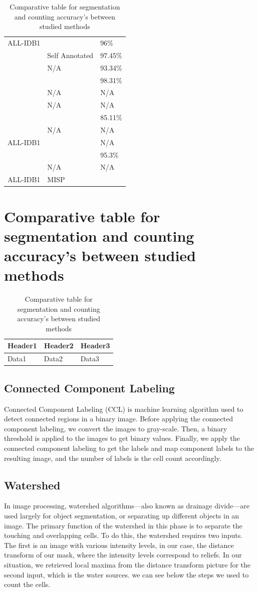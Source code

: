\documentclass[conference]{IEEEtran}
\begin{document}
\begin{table}[htbp]
\centering
\caption{Comparative table for segmentation and counting accuracy's between studied methods}
\label{tab:label}
\begin{tabular}{lll}
\hline
ALL-IDB1 & & 96\% \\
 & Self Annotated & 97.45\% \\
 & N/A & 93.34\% \\
 & & 98.31\% \\
 & N/A & N/A \\
 & N/A & N/A \\
 & & 85.11\% \\
 & N/A & N/A \\
ALL-IDB1 & & N/A \\
 & & 95.3\% \\
 & N/A & N/A \\
ALL-IDB1 & MISP & \\
\hline
\end{tabular}
\end{table}

\section{Comparative table for segmentation and counting accuracy’s between studied methods}
\begin{table}[htbp]
\centering
\caption{Comparative table for segmentation and counting accuracy’s between studied methods}
\label{tab:label}
\begin{tabular}{lll}
\hline
Header1 & Header2 & Header3 \\
\hline
Data1 & Data2 & Data3 \\
\hline
\end{tabular}
\end{table}
\subsection{Connected Component Labeling}
Connected Component Labeling (CCL) is machine learning algorithm used to detect connected regions in a binary image. Before applying the connected component labeling, we convert the images to gray-scale. Then, a binary threshold is applied to the images to get binary values. Finally, we apply the connected component labeling to get the labels and map component labels to the resulting image, and the number of labels is the cell count accordingly.
\subsection{Watershed}
In image processing, watershed algorithms—also known as drainage divide—are used largely for object segmentation, or separating up different objects in an image. The primary function of the watershed in this phase is to separate the touching and overlapping cells. To do this, the watershed requires two inputs. The first is an image with various intensity levels, in our case, the distance transform of our mask, where the intensity levels correspond to reliefs. In our situation, we retrieved local maxima from the distance transform picture for the second input, which is the water sources. we can see below the steps we used to count the cells.
\end{document}
